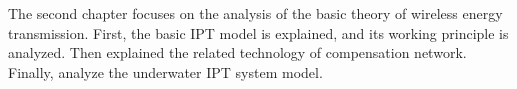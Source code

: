 The second chapter focuses on the analysis of the basic theory of wireless energy transmission. First, the basic IPT model is explained, and its working principle is analyzed. Then explained the related technology of compensation network. Finally, analyze the underwater IPT system model.


